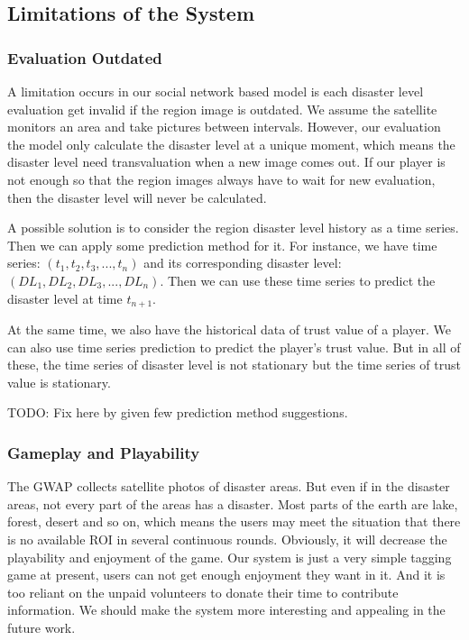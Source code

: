 \subsection{Limitations of the System}

\subsubsection{Evaluation Outdated}

A limitation occurs in our social network based model is each disaster level evaluation get invalid 
if the region image is outdated. 
We assume the satellite monitors an area and take pictures between intervals. However, our evaluation
the model only calculate the disaster level at a unique moment, which means the disaster level need 
transvaluation when a new image comes out.
If our player is not enough so that the region images always have to wait for new evaluation, then the
disaster level will never be calculated.

A possible solution is to consider the region disaster level history as a time series. Then we can apply
some prediction method for it. For instance, we have time series: $(t_1, t_2, t_3, ..., t_n)$
and its corresponding disaster level: $(DL_1, DL_2, DL_3, ..., DL_n)$.
Then we can use these time series to predict the disaster level at time $t_{n+1}$.

At the same time, we also have the historical data of trust value of a player. We can also
use time series prediction to predict the player's trust value. But in all of these, the time series
of disaster level is not stationary but the time series of trust value is stationary.

TODO: Fix here by given few prediction method suggestions.

\subsubsection{Gameplay and Playability}

The GWAP collects satellite photos of disaster areas. But even if in the disaster areas, 
not every part of the areas has a disaster. Most parts of the earth are lake, forest, 
desert and so on, which means the users may meet the situation that there is no available 
ROI in several continuous rounds. Obviously, it will decrease the playability and enjoyment of the game.
Our system is just a very simple tagging game at present, users can not get enough enjoyment they want in it. 
And it is too reliant on the unpaid volunteers to donate their time to contribute information. 
We should make the system more interesting and appealing in the future work.

